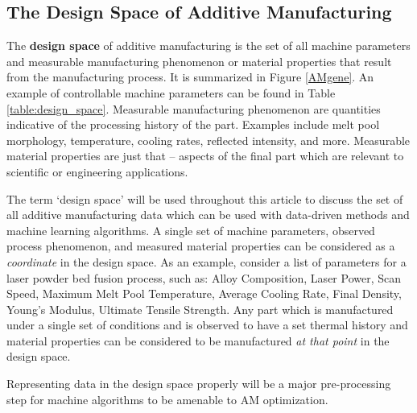 \subsection{The Design Space of Additive Manufacturing}
The \textbf{design space} of additive manufacturing is the set of all machine parameters and measurable manufacturing phenomenon or material properties that result from the manufacturing process. It is summarized in Figure \ref{AMgene}. An example of controllable machine parameters can be found in Table \ref{table:design_space}. Measurable manufacturing phenomenon are quantities indicative of the processing history of the part. Examples include melt pool morphology, temperature, cooling rates, reflected intensity, and more. Measurable material properties are just that -- aspects of the final part which are relevant to scientific or engineering applications. 

The term `design space' will be used throughout this article to discuss the set of all additive manufacturing data which can be used with data-driven methods and machine learning algorithms. A single set of machine parameters, observed process phenomenon, and measured material properties can be considered as a \textit{coordinate} in the design space. As an example, consider a list of parameters for a laser powder bed fusion process, such as: Alloy Composition, Laser Power, Scan Speed, Maximum Melt Pool Temperature, Average Cooling Rate, Final Density, Young's Modulus, Ultimate Tensile Strength. Any part which is manufactured under a single set of conditions and is observed to have a set thermal history and material properties can be considered to be manufactured \textit{at that point} in the design space.

Representing data in the design space properly will be a major pre-processing step for machine algorithms to be amenable to AM optimization.

